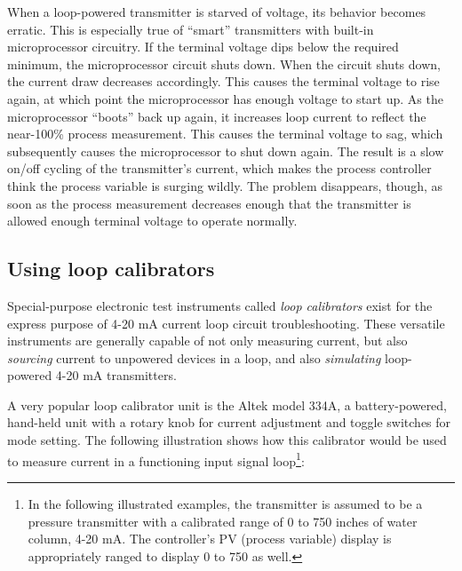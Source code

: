 When a loop-powered transmitter is starved of voltage, its behavior becomes erratic.  This is especially true of ``smart'' transmitters with built-in microprocessor circuitry.  If the terminal voltage dips below the required minimum, the microprocessor circuit shuts down.  When the circuit shuts down, the current draw decreases accordingly.  This causes the terminal voltage to rise again, at which point the microprocessor has enough voltage to start up.  As the microprocessor ``boots'' back up again, it increases loop current to reflect the near-100\% process measurement.  This causes the terminal voltage to sag, which subsequently causes the microprocessor to shut down again.  The result is a slow on/off cycling of the transmitter's current, which makes the process controller think the process variable is surging wildly.  The problem disappears, though, as soon as the process measurement decreases enough that the transmitter is allowed enough terminal voltage to operate normally. 






\filbreak
\subsection{Using loop calibrators}

Special-purpose electronic test instruments called \textit{loop calibrators} exist for the express purpose of 4-20 mA current loop circuit troubleshooting.  These versatile instruments are generally capable of not only measuring current, but also \textit{sourcing} current to unpowered devices in a loop, and also \textit{simulating} loop-powered 4-20 mA transmitters.    

A very popular loop calibrator unit is the Altek model 334A, a battery-powered, hand-held unit with a rotary knob for current adjustment and toggle switches for mode setting.  The following illustration shows how this calibrator would be used to measure current in a functioning input signal loop\footnote{In the following illustrated examples, the transmitter is assumed to be a pressure transmitter with a calibrated range of 0 to 750 inches of water column, 4-20 mA.  The controller's PV (process variable) display is appropriately ranged to display 0 to 750 as well.}: 

